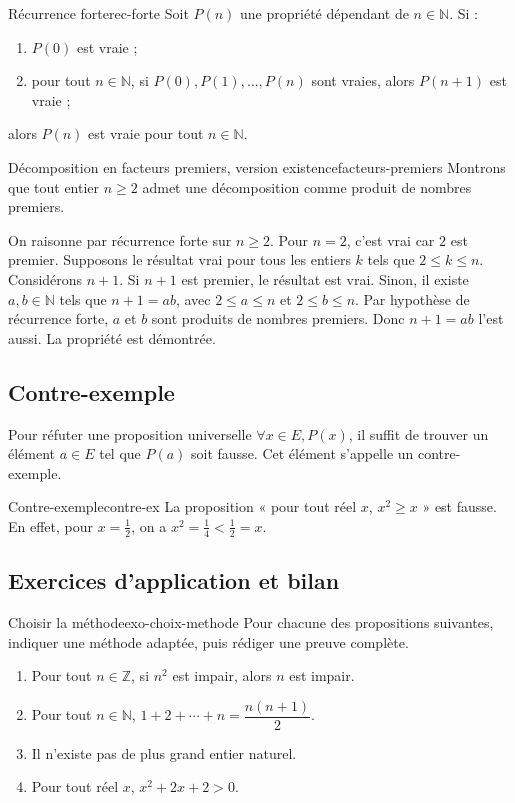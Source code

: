 \documentclass[11pt,a4paper]{article}
\newcommand{\N}{\mathbb{N}}
\newcommand{\Z}{\mathbb{Z}}
\begin{document}
\begin{theorembox}{Récurrence forte}{rec-forte}
Soit $P(n)$ une propriété dépendant de $n\in\N$. Si :
\begin{enumerate}
  \item $P(0)$ est vraie ;
  \item pour tout $n\in\N$, si $P(0),P(1),\dots,P(n)$ sont vraies, alors $P(n+1)$ est vraie ;
\end{enumerate}
alors $P(n)$ est vraie pour tout $n\in\N$.
\end{theorembox}

\begin{exemplebox}{Décomposition en facteurs premiers, version existence}{facteurs-premiers}
Montrons que tout entier $n\geq2$ admet une décomposition comme produit de nombres premiers.

On raisonne par récurrence forte sur $n\geq2$. Pour $n=2$, c'est vrai car $2$ est premier. Supposons le résultat vrai pour tous les entiers $k$ tels que $2\leq k\leq n$. Considérons $n+1$. Si $n+1$ est premier, le résultat est vrai. Sinon, il existe $a,b\in\N$ tels que $n+1=ab$, avec $2\leq a\leq n$ et $2\leq b\leq n$. Par hypothèse de récurrence forte, $a$ et $b$ sont produits de nombres premiers. Donc $n+1=ab$ l'est aussi. La propriété est démontrée.
\end{exemplebox}

\subsection{Contre-exemple}

\begin{methodebox}
Pour réfuter une proposition universelle $\forall x\in E, P(x)$, il suffit de trouver un élément $a\in E$ tel que $P(a)$ soit fausse. Cet élément s'appelle un contre-exemple.
\end{methodebox}

\begin{exemplebox}{Contre-exemple}{contre-ex}
La proposition « pour tout réel $x$, $x^2\geq x$ » est fausse. En effet, pour $x=\frac12$, on a $x^2=\frac14<\frac12=x$.
\end{exemplebox}

\subsection{Exercices d'application et bilan}

\begin{exercicebox}{Choisir la méthode}{exo-choix-methode}
Pour chacune des propositions suivantes, indiquer une méthode adaptée, puis rédiger une preuve complète.
\begin{enumerate}
  \item Pour tout $n\in\Z$, si $n^2$ est impair, alors $n$ est impair.
  \item Pour tout $n\in\N$, $1+2+\cdots+n=\dfrac{n(n+1)}2$.
  \item Il n'existe pas de plus grand entier naturel.
  \item Pour tout réel $x$, $x^2+2x+2>0$.
\end{enumerate}
\end{exercicebox}
\end{document}
